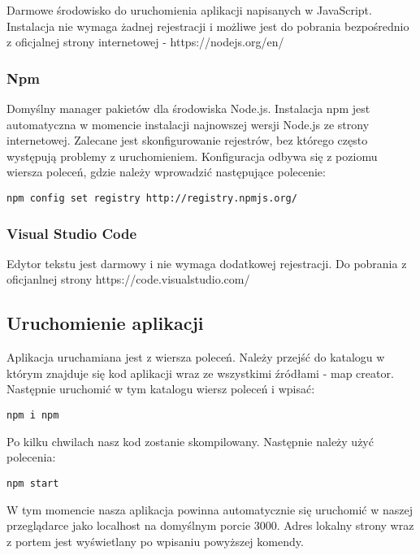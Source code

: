 \documentclass{article}
\begin{document}
Darmowe środowisko do uruchomienia aplikacji napisanych w JavaScript. Instalacja nie wymaga żadnej rejestracji i możliwe jest do pobrania bezpośrednio z oficjalnej strony internetowej - https://nodejs.org/en/ 

\subsubsection{Npm}
 
Domyślny manager pakietów dla środowiska Node.js. Instalacja npm jest automatyczna w momencie instalacji najnowszej wersji Node.js ze strony internetowej. Zalecane jest skonfigurowanie rejestrów, bez którego często występują problemy z uruchomieniem. Konfiguracja odbywa się z poziomu wiersza poleceń, gdzie należy wprowadzić następujące polecenie:  
\begin{lstlisting}
npm config set registry http://registry.npmjs.org/
\end{lstlisting}


\subsubsection{Visual Studio Code}

Edytor tekstu jest darmowy i nie wymaga dodatkowej rejestracji. Do pobrania z oficjanlnej strony https://code.visualstudio.com/

\subsection{Uruchomienie aplikacji}

Aplikacja uruchamiana jest z wiersza poleceń. Należy przejść do katalogu w którym znajduje się kod aplikacji wraz ze wszystkimi źródłami - map creator. Następnie uruchomić w tym katalogu wiersz poleceń i wpisać: 
\begin{lstlisting}
npm i npm
\end{lstlisting}
Po kilku chwilach nasz kod zostanie skompilowany. Następnie należy użyć polecenia:
\begin{lstlisting}
npm start
\end{lstlisting}
W tym momencie nasza aplikacja powinna automatycznie się uruchomić w naszej przeglądarce jako localhost na domyślnym porcie 3000. Adres lokalny strony wraz z portem jest wyświetlany po wpisaniu powyższej komendy.
\newpage
\end{document}
